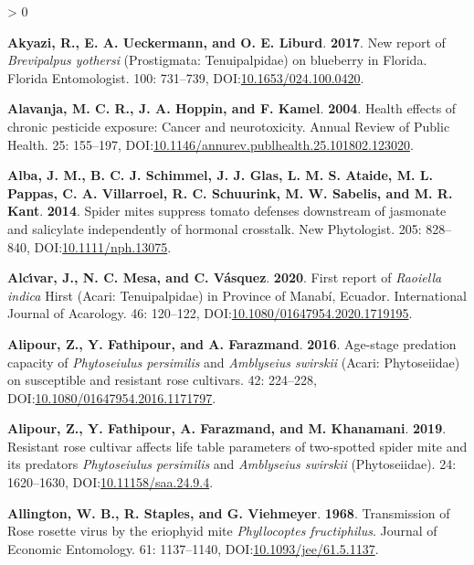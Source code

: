 \documentclass{ufdissertation}[overrideChapters] %
\newlength{\cslhangindent}
\newenvironment{CSLReferences}[2] %
 {%
  \setlength{\parindent}{0pt}
  \ifodd #1 \everypar{\setlength{\hangindent}{\cslhangindent}}\ignorespaces\fi
  \ifnum #2 > 0
  \setlength{\parskip}{#2\baselineskip}
  \fi
 }%
 {}
\begin{document}
{\begin{CSLReferences}{1}{1}
\leavevmode{}%
\textbf{Akyazi, R., E. A. Ueckermann, and O. E. Liburd}. \textbf{2017}. New report of {\emph{Brevipalpus yothersi}} ({Prostigmata}: {Tenuipalpidae}) on blueberry in {Florida}. Florida Entomologist. 100: 731--739, DOI:\href{https://doi.org/10.1653/024.100.0420}{10.1653/024.100.0420}.

\leavevmode{}%
\textbf{Alavanja, M. C. R., J. A. Hoppin, and F. Kamel}. \textbf{2004}. Health effects of chronic pesticide exposure: Cancer and neurotoxicity. Annual Review of Public Health. 25: 155--197, DOI:\href{https://doi.org/10.1146/annurev.publhealth.25.101802.123020}{10.1146/annurev.publhealth.25.101802.123020}.

\leavevmode{}%
\textbf{Alba, J. M., B. C. J. Schimmel, J. J. Glas, L. M. S. Ataide, M. L. Pappas, C. A. Villarroel, R. C. Schuurink, M. W. Sabelis, and M. R. Kant}. \textbf{2014}. Spider mites suppress tomato defenses downstream of jasmonate and salicylate independently of hormonal crosstalk. New Phytologist. 205: 828--840, DOI:\href{https://doi.org/10.1111/nph.13075}{10.1111/nph.13075}.

\leavevmode{}%
\textbf{Alcı́var, J., N. C. Mesa, and C. Vásquez}. \textbf{2020}. First report of {\emph{Raoiella indica}} {Hirst} ({Acari}: {Tenuipalpidae}) in {Province} of {Manab{í}}, {Ecuador}. International Journal of Acarology. 46: 120--122, DOI:\href{https://doi.org/10.1080/01647954.2020.1719195}{10.1080/01647954.2020.1719195}.

\leavevmode{}%
\textbf{Alipour, Z., Y. Fathipour, and A. Farazmand}. \textbf{2016}. Age-stage predation capacity of {\emph{Phytoseiulus persimilis}} and {\emph{Amblyseius swirskii}} ({Acari}: {Phytoseiidae}) on susceptible and resistant rose cultivars. 42: 224--228, DOI:\href{https://doi.org/10.1080/01647954.2016.1171797}{10.1080/01647954.2016.1171797}.

\leavevmode{}%
\textbf{Alipour, Z., Y. Fathipour, A. Farazmand, and M. Khanamani}. \textbf{2019}. Resistant rose cultivar affects life table parameters of two-spotted spider mite and its predators {\emph{Phytoseiulus persimilis}} and {\emph{Amblyseius swirskii}} ({Phytoseiidae}). 24: 1620--1630, DOI:\href{https://doi.org/10.11158/saa.24.9.4}{10.11158/saa.24.9.4}.

\leavevmode{}%
\textbf{Allington, W. B., R. Staples, and G. Viehmeyer}. \textbf{1968}. Transmission of {Rose rosette virus} by the eriophyid mite {\emph{Phyllocoptes fructiphilus}}. Journal of Economic Entomology. 61: 1137--1140, DOI:\href{https://doi.org/10.1093/jee/61.5.1137}{10.1093/jee/61.5.1137}.


\end{CSLReferences}}
\end{document}
